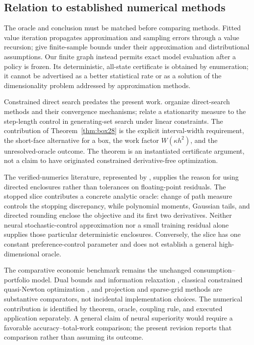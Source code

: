 
\subsection{Relation to established numerical methods}\label{sec:literature29}
The oracle and conclusion must be matched before comparing methods. Fitted value iteration propagates approximation and sampling errors through a value recursion; \citet{MunosSzepesvari2008} give finite-sample bounds under their approximation and distributional assumptions. Our finite graph instead permits exact model evaluation after a policy is frozen. Its deterministic, all-state certificate is obtained by enumeration; it cannot be advertised as a better statistical rate or as a solution of the dimensionality problem addressed by approximation methods.

Constrained direct search predates the present work. \citet{KoldaLewisTorczon2003} organize direct-search methods and their convergence mechanisms; \citet{KoldaLewisTorczon2006} relate a stationarity measure to the step-length control in generating-set search under linear constraints. The contribution of Theorem~\ref{thm:box28} is the explicit interval-width requirement, the short-face alternative for a box, the work factor $W(\kappa h^2)$, and the unresolved-oracle outcome. The theorem is an instantiated certificate argument, not a claim to have originated constrained derivative-free optimization.

The verified-numerics literature, represented by \citet{Rump2010}, supplies the reason for using directed enclosures rather than tolerances on floating-point residuals. The stopped slice contributes a concrete analytic oracle: change of path measure controls the stopping discrepancy, while polynomial moments, Gaussian tails, and directed rounding enclose the objective and its first two derivatives. Neither neural stochastic-control approximation \citep{HureEtAl2021} nor a small training residual alone supplies those particular deterministic enclosures. Conversely, the slice has one constant preference-control parameter and does not establish a general high-dimensional oracle.

The comparative economic benchmark remains the unchanged consumption--portfolio model. Dual bounds and information relaxation \citep{BrownSmithSun2010,BrownSmith2014}, classical constrained quasi-Newton optimization \citep{ByrdEtAl1995}, and projection and sparse-grid methods \citep{Judd1998,BrummScheidegger2017} are substantive comparators, not incidental implementation choices. The numerical contribution is identified by theorem, oracle, coupling rule, and executed application separately. A general claim of neural superiority would require a favorable accuracy--total-work comparison; the present revision reports that comparison rather than assuming its outcome.
